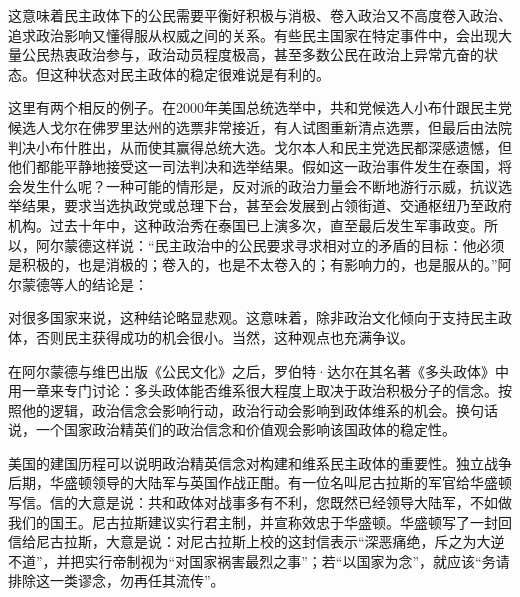 
这意味着民主政体下的公民需要平衡好积极与消极、卷入政治又不高度卷入政治、追求政治影响又懂得服从权威之间的关系。有些民主国家在特定事件中，会出现大量公民热衷政治参与，政治动员程度极高，甚至多数公民在政治上异常亢奋的状态。但这种状态对民主政体的稳定很难说是有利的。

这里有两个相反的例子。在2000年美国总统选举中，共和党候选人小布什跟民主党候选人戈尔在佛罗里达州的选票非常接近，有人试图重新清点选票，但最后由法院判决小布什胜出，从而使其赢得总统大选。戈尔本人和民主党选民都深感遗憾，但他们都能平静地接受这一司法判决和选举结果。假如这一政治事件发生在泰国，将会发生什么呢？一种可能的情形是，反对派的政治力量会不断地游行示威，抗议选举结果，要求当选执政党或总理下台，甚至会发展到占领街道、交通枢纽乃至政府机构。过去十年中，这种政治秀在泰国已上演多次，直至最后发生军事政变。所以，阿尔蒙德这样说：“民主政治中的公民要求寻求相对立的矛盾的目标：他必须是积极的，也是消极的；卷入的，也是不太卷入的；有影响力的，也是服从的。”阿尔蒙德等人的结论是：


对很多国家来说，这种结论略显悲观。这意味着，除非政治文化倾向于支持民主政体，否则民主获得成功的机会很小。当然，这种观点也充满争议。

在阿尔蒙德与维巴出版《公民文化》之后，罗伯特·达尔在其名著《多头政体》中用一章来专门讨论：多头政体能否维系很大程度上取决于政治积极分子的信念。按照他的逻辑，政治信念会影响行动，政治行动会影响到政体维系的机会。换句话说，一个国家政治精英们的政治信念和价值观会影响该国政体的稳定性。

美国的建国历程可以说明政治精英信念对构建和维系民主政体的重要性。独立战争后期，华盛顿领导的大陆军与英国作战正酣。有一位名叫尼古拉斯的军官给华盛顿写信。信的大意是说：共和政体对战事多有不利，您既然已经领导大陆军，不如做我们的国王。尼古拉斯建议实行君主制，并宣称效忠于华盛顿。华盛顿写了一封回信给尼古拉斯，大意是说：对尼古拉斯上校的这封信表示“深恶痛绝，斥之为大逆不道”，并把实行帝制视为“对国家祸害最烈之事”；若“以国家为念”，就应该“务请排除这一类谬念，勿再任其流传”。

